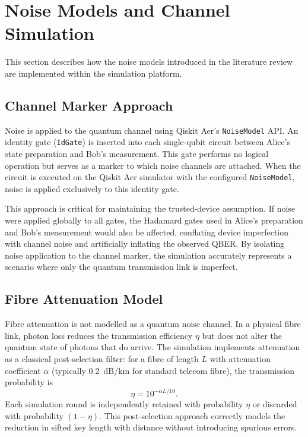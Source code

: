 
\section{Noise Models and Channel Simulation}

This section describes how the noise models introduced in the literature review are implemented within the simulation platform.

\subsection{Channel Marker Approach}

Noise is applied to the quantum channel using Qiskit Aer's \texttt{NoiseModel} API. An identity gate (\texttt{IdGate}) is inserted into each single-qubit circuit between Alice's state preparation and Bob's measurement. This gate performs no logical operation but serves as a marker to which noise channels are attached. When the circuit is executed on the Qiskit Aer simulator with the configured \texttt{NoiseModel}, noise is applied exclusively to this identity gate.

This approach is critical for maintaining the trusted-device assumption. If noise were applied globally to all gates, the Hadamard gates used in Alice's preparation and Bob's measurement would also be affected, conflating device imperfection with channel noise and artificially inflating the observed QBER. By isolating noise application to the channel marker, the simulation accurately represents a scenario where only the quantum transmission link is imperfect.

\subsection{Fibre Attenuation Model}

Fibre attenuation is not modelled as a quantum noise channel. In a physical fibre link, photon loss reduces the transmission efficiency $\eta$ but does not alter the quantum state of photons that do arrive. The simulation implements attenuation as a classical post-selection filter: for a fibre of length $L$ with attenuation coefficient $\alpha$ (typically 0.2~dB/km for standard telecom fibre), the transmission probability is
%
\begin{equation}
\label{eq:attenuation}
\eta = 10^{-\alpha L / 10}.
\end{equation}
%
Each simulation round is independently retained with probability $\eta$ or discarded with probability $(1 - \eta)$. This post-selection approach correctly models the reduction in sifted key length with distance without introducing spurious errors.

